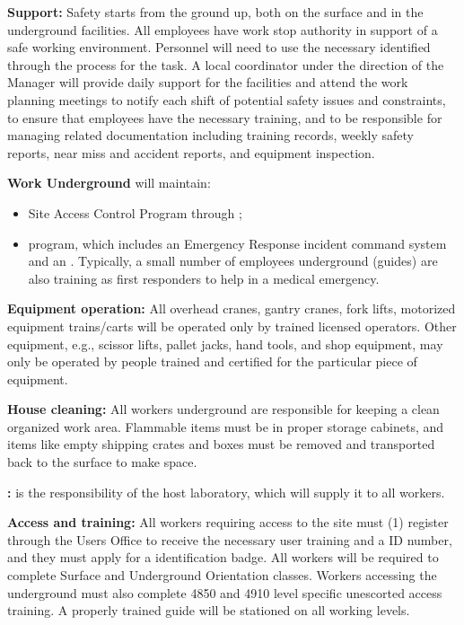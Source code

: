 {\bf {} Support:} Safety starts from the ground up, both on the surface and in the underground facilities. All employees have work stop authority in support of  a safe working environment. Personnel will need to use the necessary  identified through the  process for the task. A local  coordinator under the direction of the   Manager will provide daily support for the facilities and attend the %
work planning meetings to notify each shift of potential safety issues and constraints, to ensure that  employees have the necessary  training, and to be responsible  for managing  related  documentation including training records, weekly safety reports, near miss and accident reports, and equipment inspection.

{\bf Work Underground}  will maintain:
\begin{itemize}
    \item Site Access Control Program through ;
    \item {} program, which includes an Emergency Response incident command system and an .  Typically, a small number of employees underground (guides) are also training as first responders to help in a medical emergency.
    
\end{itemize}

{\bf Equipment operation:} All overhead cranes, gantry cranes, fork lifts, motorized equipment trains/carts will be operated only by trained licensed operators. 
Other equipment, e.g., scissor lifts, pallet jacks, hand tools, and shop equipment, may only be operated by people trained
and certified for the particular piece of equipment.

{\bf House cleaning:} All workers underground are responsible for keeping a clean organized work area. Flammable items must be in proper storage cabinets, and items like empty shipping crates and boxes must be removed and %
transported back to the surface to make space.

{\bf {}:} 
 is the responsibility of the host laboratory,  %
which will supply it to all workers. 

{\bf Access and training:}  All  workers requiring access to the  site must (1) register through the  Users Office to receive the necessary user training and a  ID number, and they must apply for a  identification badge. %
All  workers will be required to complete  Surface and Underground Orientation classes. Workers accessing the underground must also complete 4850 and 4910 level specific unescorted access training. %
A properly trained guide will be stationed on all working levels. 

